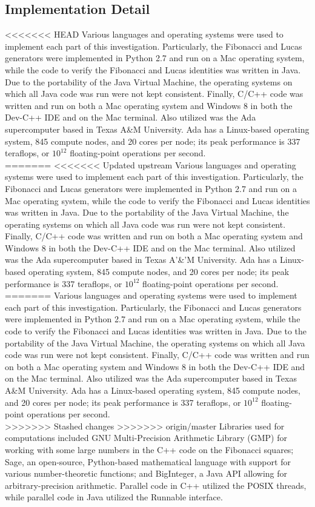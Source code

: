 \documentclass[11pt]{article}
\begin{document}
\subsection{Implementation Detail}
<<<<<<< HEAD
Various languages and operating systems were used to implement each part of this investigation. Particularly, the Fibonacci and Lucas generators were implemented in Python 2.7 and run on a Mac operating system, while the code to verify the Fibonacci and Lucas identities was written in Java. Due to the portability of the Java Virtual Machine, the operating systems on which all Java code was run were not kept consistent. Finally, C/C++ code was written and run on both a Mac operating system and Windows 8 in both the Dev-C++ IDE and on the Mac terminal. Also utilized was the Ada supercomputer based in Texas A\&M University. Ada has a Linux-based operating system, 845 compute nodes, and 20 cores per node; its peak performance is 337 teraflops, or $10^{12}$ floating-point operations per second. \\
=======
<<<<<<< Updated upstream
Various languages and operating systems were used to implement each part of this investigation. Particularly, the Fibonacci and Lucas generators were implemented in Python 2.7 and run on a Mac operating system, while the code to verify the Fibonacci and Lucas identities was written in Java. Due to the portability of the Java Virtual Machine, the operating systems on which all Java code was run were not kept consistent. Finally, C/C++ code was written and run on both a Mac operating system and Windows 8 in both the Dev-C++ IDE and on the Mac terminal. Also utilized was the Ada supercomputer based in Texas A'\&'M University. Ada has a Linux-based operating system, 845 compute nodes, and 20 cores per node; its peak performance is 337 teraflops, or $10^{12}$ floating-point operations per second. \\
=======
Various languages and operating systems were used to implement each part of this investigation. Particularly, the Fibonacci and Lucas generators were implemented in Python 2.7 and run on a Mac operating system, while the code to verify the Fibonacci and Lucas identities was written in Java. Due to the portability of the Java Virtual Machine, the operating systems on which all Java code was run were not kept consistent. Finally, C/C++ code was written and run on both a Mac operating system and Windows 8 in both the Dev-C++ IDE and on the Mac terminal. Also utilized was the Ada supercomputer based in Texas A\&M University. Ada has a Linux-based operating system, 845 compute nodes, and 20 cores per node; its peak performance is 337 teraflops, or $10^{12}$ floating-point operations per second. \\
>>>>>>> Stashed changes
>>>>>>> origin/master
Libraries used for computations included GNU Multi-Precision Arithmetic Library (GMP) for working with some large numbers in the C++ code on the Fibonacci squares; Sage, an open-source, Python-based mathematical language with support for various number-theoretic functions; and BigInteger, a Java API allowing for arbitrary-precision arithmetic. Parallel code in C++ utilized the POSIX threads, while parallel code in Java utilized the Runnable interface.
\end{document}
